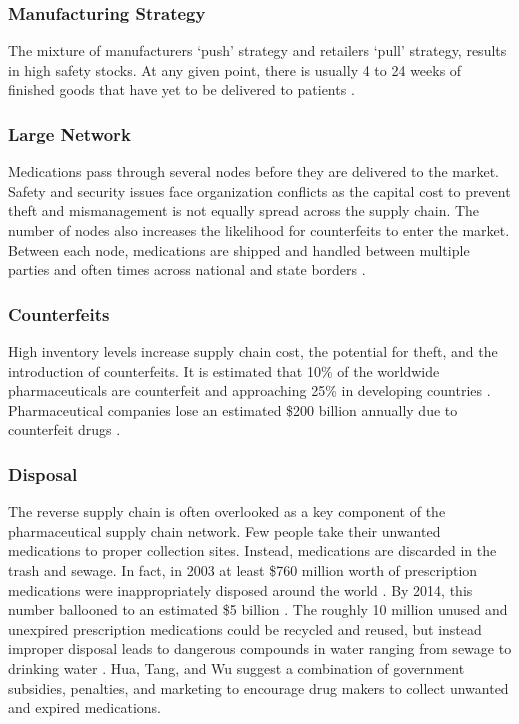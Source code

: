 \documentclass[sigconf]{acmart}
\begin{document}
\subsubsection{Manufacturing Strategy} The mixture of manufacturers `push' strategy and retailers `pull' strategy, results in high safety stocks. At any given point, there is usually 4 to 24 weeks of finished goods that have yet to be delivered to patients \cite{Shah01}. 

\subsubsection{Large Network} Medications pass through several nodes before they are delivered to the market. Safety and security issues face organization conflicts as the capital cost to prevent theft and mismanagement is not equally spread across the supply chain. The number of nodes also increases the likelihood for counterfeits to enter the market. Between each node, medications are shipped and handled between multiple parties and often times across national and state borders \cite{Shah01}.

\subsubsection{Counterfeits} High inventory levels increase supply chain cost, the potential for theft, and the introduction of counterfeits. It is estimated that 10\% of the worldwide pharmaceuticals are counterfeit and approaching 25\% in developing countries \cite{Kelesidis01}. Pharmaceutical companies lose an estimated \$200 billion annually due to counterfeit drugs \cite{das2017}.


\subsubsection{Disposal} The reverse supply chain is often overlooked as a key component of the pharmaceutical supply chain network. Few people take their unwanted medications to proper collection sites. Instead, medications are discarded in the trash and sewage. In fact, in 2003 at least \$760 million worth of prescription medications were inappropriately disposed around the world \cite{Hua01}. By 2014, this number ballooned to an estimated \$5 billion \cite{Lenzerg01}. The roughly 10 million unused and unexpired prescription medications could be recycled and reused, but instead improper disposal leads to dangerous compounds in water ranging from sewage to drinking water \cite{Hua01} \cite{Lenzerg01}.  Hua, Tang, and Wu \cite{Hua01} suggest a combination of government subsidies, penalties, and marketing to encourage drug makers to collect unwanted and expired medications. 
\end{document}
